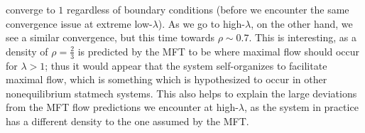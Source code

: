 \documentclass[
reprint, amsmath,amssymb, aps,
 pre, longbibliography,
]{revtex4-1}
\begin{document}
converge to $1$ regardless of boundary conditions (before we encounter the same convergence issue at extreme low-$\lambda$). As we go to high-$\lambda$, on the other hand, we see a similar convergence, but this time towards $\rho \sim 0.7$.
This is interesting, as a density of $\rho=\frac{2}{3}$ is predicted by the MFT to be where maximal flow should occur for $\lambda>1$; thus it would appear that the system self-organizes to facilitate maximal flow, which is something which
is hypothesized to occur in other nonequilibrium statmech systems. This also helps to explain the large deviations from the MFT flow predictions we encounter at high-$\lambda$, as the system in practice has a different density to the one assumed
by the MFT.




\end{document}
